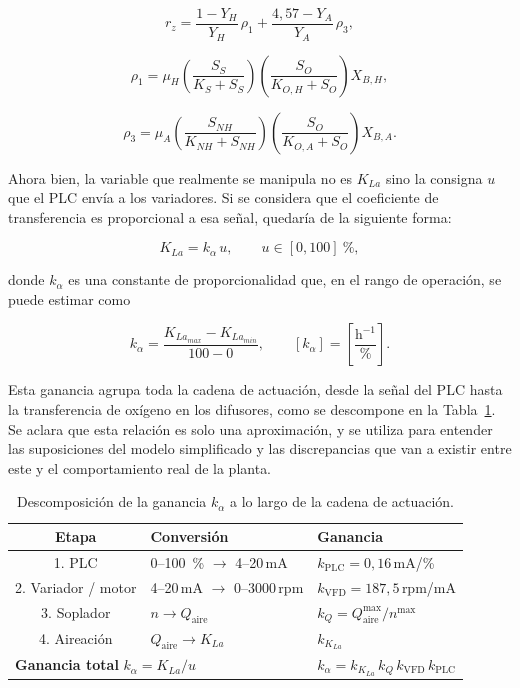 \begin{equation}
    r_{z} = \frac{1 - Y_H}{Y_H}\,\rho_1 + \frac{4{,}57 - Y_A}{Y_A}\,\rho_3 ,
    \label{eq:car_rz}
\end{equation}

\begin{equation}
    \rho_1 = \mu_H \left(\frac{S_S}{K_S + S_S}\right)\left(\frac{S_O}{K_{O,H} + S_O}\right) X_{B,H},
\end{equation}

\begin{equation}
    \rho_3 = \mu_A \left(\frac{S_{NH}}{K_{NH} + S_{NH}}\right)\left(\frac{S_O}{K_{O,A} + S_O}\right) X_{B,A}.
\end{equation}


Ahora bien, la variable que realmente se manipula no es $K_{La}$ sino la
consigna $u$ que el PLC envía a los variadores. Si se considera que el
coeficiente de transferencia es proporcional a esa señal, quedaría de la
siguiente forma:

\begin{equation}
K_{La} = k_\alpha\, u , \qquad u \in [0,100]~\%,
\end{equation}

donde $k_\alpha$ es una constante de proporcionalidad que, en el rango de
operación, se puede estimar como

\begin{equation}
k_\alpha = \frac{K_{La_{max}}-K_{La_{min}}}{100-0},
\qquad
\left[k_\alpha\right] = \left[\frac{\mathrm{h}^{-1}}{\%}\right].
\end{equation}

Esta ganancia agrupa toda la cadena de actuación, desde la señal del PLC hasta
la transferencia de oxígeno en los difusores, como se descompone en la
Tabla~\ref{tab:gain_decomposition}. Se aclara que esta relación es solo una
aproximación, y se utiliza para entender las suposiciones del modelo
simplificado y las discrepancias que van a existir entre este y el
comportamiento real de la planta. 

\begin{table}[!htbp]
\centering
\caption{Descomposición de la ganancia $k_\alpha$ a lo largo de la cadena de
actuación.}
\label{tab:gain_decomposition}
\begin{tabular}{cll}
\toprule
\textbf{Etapa} & \textbf{Conversión} & \textbf{Ganancia} \\
\midrule
1. PLC          & 0--100~\% $\to$ 4--20\,mA          & $k_{\mathrm{PLC}} = 0{,}16$\,mA/\% \\
2. Variador / motor  & 4--20\,mA $\to$ 0--3000\,rpm  & $k_{\mathrm{VFD}} = 187{,}5$\,rpm/mA \\
3. Soplador     & $n \to Q_{\mathrm{aire}}$            & $k_Q = Q_{\mathrm{aire}}^{\max}/n^{\max}$ \\
4. Aireación    & $Q_{\mathrm{aire}} \to K_{La}$      & $k_{K_{La}}$ \\
\midrule[\heavyrulewidth]
\multicolumn{2}{l}{\textbf{Ganancia total} $k_\alpha = K_{La}/u$}
                & $k_\alpha = k_{K_{La}}\, k_Q\, k_{\mathrm{VFD}}\, k_{\mathrm{PLC}}$ \\
\bottomrule
\end{tabular}
\end{table}

